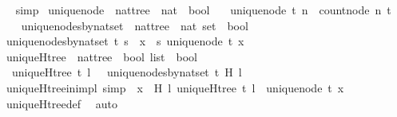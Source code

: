 \begin{isabellebody}
\isadelimproof
\ %
\endisadelimproof
%
\isatagproof
{}\isamarkupfalse%
\ simp%
\endisatagproof
{\isafoldproof}%
%
\isadelimproof
%
\endisadelimproof
\isanewline
\isanewline
{}\isamarkupfalse%
\ unique{\isacharunderscore}node\ {\isacharcolon}{\isacharcolon}\ {\isachardoublequoteopen}nattree\ {\isasymRightarrow}\ nat\ {\isasymRightarrow}\ bool{\isachardoublequoteclose}\ \isanewline
\ \ {\isachardoublequoteopen}unique{\isacharunderscore}node\ t\ n\ {\isacharequal}\ {\isacharparenleft}count{\isacharunderscore}node\ n\ t\ {\isacharequal}\ {}{\isacharparenright}{\isachardoublequoteclose}\isanewline
\ \ \isanewline
{}\isamarkupfalse%
\ unique{\isacharunderscore}nodes{\isacharunderscore}by{\isacharunderscore}nat{\isacharunderscore}set\ {\isacharcolon}{\isacharcolon}\ {\isachardoublequoteopen}nattree\ {\isasymRightarrow}\ nat\ set\ {\isasymRightarrow}\ bool{\isachardoublequoteclose}\ \isanewline
\ {\isachardoublequoteopen}unique{\isacharunderscore}nodes{\isacharunderscore}by{\isacharunderscore}nat{\isacharunderscore}set\ t\ s\ {\isacharequal}\ {\isacharparenleft}{\isasymforall}x\ {\isasymin}\ s{\isachardot}\ unique{\isacharunderscore}node\ t\ x{\isacharparenright}{\isachardoublequoteclose}\isanewline
\ \ \isanewline
{}\isamarkupfalse%
\ uniqueH{\isacharunderscore}tree\ {\isacharcolon}{\isacharcolon}\ {\isachardoublequoteopen}nattree\ {\isasymRightarrow}\ bool\ list\ {\isasymRightarrow}\ bool{\isachardoublequoteclose}\ \isanewline
\ \ {\isachardoublequoteopen}uniqueH{\isacharunderscore}tree\ t\ l\ {\isacharequal}\ \ unique{\isacharunderscore}nodes{\isacharunderscore}by{\isacharunderscore}nat{\isacharunderscore}set\ t\ {\isacharparenleft}H\ l{\isacharparenright}{\isachardoublequoteclose}\ \ \ \ \isanewline
\isanewline
{}\isamarkupfalse%
\ uniqueH{\isacharunderscore}tree{\isacharunderscore}in{\isacharunderscore}imp{\isacharunderscore}l\ {\isacharbrackleft}simp{\isacharbrackright}{\isacharcolon}\ {\isachardoublequoteopen}{\isasymforall}\ x\ {\isasymin}\ H\ l{\isachardot}\ uniqueH{\isacharunderscore}tree\ t\ l\ {\isasymlongrightarrow}\ unique{\isacharunderscore}node\ t\ x{\isachardoublequoteclose}\isanewline
%
\isadelimproof
\ \ %
\endisadelimproof
%
\isatagproof
{}\isamarkupfalse%
\ uniqueH{\isacharunderscore}tree{\isacharunderscore}def\ \isamarkupfalse%
\ auto%
\endisatagproof
{\isafoldproof}%
%
\isadelimproof
\ \isanewline
%
\endisadelimproof
\ \ \ \ \isanewline
{}\isamarkupfalse%

\end{isabellebody}

